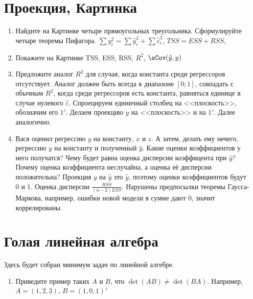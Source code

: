 \documentclass[pdftex,12pt,a4paper]{article}
\def \hy{\hat{y}}
\def \he{\hat{\varepsilon}}
\newcommand{\solution}[1]{ {\tiny #1} }
\newcommand{\problem}[1]{#1}
\begin{document}
\section{Проекция, Картинка}
\begin{enumerate}
\item Найдите на Картинке четыре прямоугольных треугольника. Сформулируйте четыре теоремы Пифагора.
\solution{$\sum y_i^2=\sum \hy_i^2+\sum \he_i^2$, $TSS=ESS+RSS$, }

\item Покажите на Картинке TSS, ESS, RSS, $R^2$, $\sCov(\hy,y)$
\solution{}


\item Предложите аналог $R^2$ для случая, когда константа среди регрессоров отсутствует. Аналог должен быть всегда в диапазоне $[0;1]$, совпадать с обычным $R^2$, когда среди регрессоров есть константа, равняться единице в случае нулевого $\he$.
\solution{Спроецируем единичный столбец на <<плоскость>>, обозначим его $1'$. Делаем проекцию $y$ на <<плоскость>> и на $1'$. Далее аналогично. }

\item Вася оценил регрессию $y$ на константу, $x$ и $z$. А затем, делать ему нечего, регрессию $y$ на константу и полученный $\hy$. Какие оценки коэффициентов у него получатся? Чему будет равна оценка дисперсии коэффицента при $\hy$? Почему оценка коэффициента неслучайна, а оценка её дисперсии положительна?
\solution{Проекция $y$ на $\hy$ это $\hy$, поэтому оценки коэффициентов будут 0 и 1. Оценка дисперсии $\frac{RSS}{(n-2)ESS}$. Нарушены предпосылки теоремы Гаусса-Маркова, например, ошибки новой модели в сумме дают 0, значит коррелированы. } 


\end{enumerate}


\section{Голая линейная алгебра}

Здесь будет собран минимум задач по линейной алгебре.

\begin{enumerate}
\item \problem{Приведите пример таких $A$ и $B$, что $\det(AB)\neq \det(BA)$.}
\solution{Например, $A=(1,2,3)$, $B=(1,0,1)'$}


 
\end{enumerate}
\end{document}
